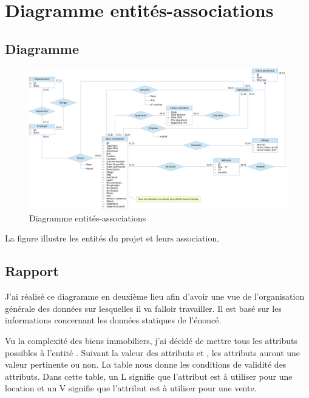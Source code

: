 \chapter{Diagramme entités-associations}

\section{Diagramme}

\begin{figure}
  \centering
  \includegraphics[angle=90,height=0.99\textheight]{IMG/er}
  \caption{Diagramme entités-associations}
  \label{img_er}
\end{figure}

La figure  illustre les entités du projet et leurs association.

\section{Rapport}

J'ai réalisé ce diagramme en deuxième lieu afin d'avoir une vue de l'organisation générale des données sur lesquelles il va falloir travailler. Il est basé sur les informations concernant les données statiques de l'énoncé.

Vu la complexité des biens immobiliers, j'ai décidé de mettre tous les attributs possibles à l'entité . Suivant la valeur des attributs  et , les attributs auront une valeur pertinente ou non. La table  nous donne les conditions de validité des attributs. Dans cette table, un \og{}L\fg{} signifie que l'attribut est à utiliser pour une location et un \og{}V\fg{} signifie que l'attribut est à utiliser pour une vente.

